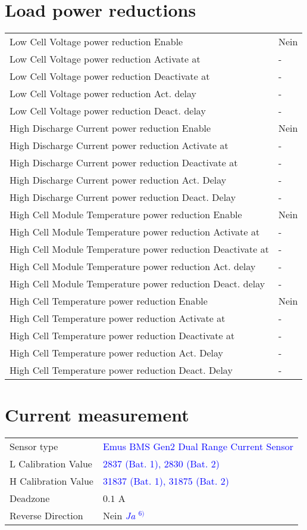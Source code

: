 \section*{Load power reductions}
\begin{tabular}{p{11cm}p{2cm}}
	Low Cell Voltage power reduction Enable & Nein \\
	Low Cell Voltage power reduction Activate at & - \\
	Low Cell Voltage power reduction Deactivate at & - \\
	Low Cell Voltage power reduction Act. delay & - \\
	Low Cell Voltage power reduction Deact. delay & - \\
	High Discharge Current power reduction Enable & Nein \\
	High Discharge Current power reduction Activate at & - \\
	High Discharge Current power reduction Deactivate at & - \\
	High Discharge Current power reduction Act. Delay & - \\
	High Discharge Current power reduction Deact. Delay & - \\
	High Cell Module Temperature power reduction Enable & Nein \\
	High Cell Module Temperature power reduction Activate at & - \\
	High Cell Module Temperature power reduction Deactivate at & - \\
	High Cell Module Temperature power reduction Act. delay & - \\
	High Cell Module Temperature power reduction Deact. delay & - \\
	High Cell Temperature power reduction Enable & Nein \\
	High Cell Temperature power reduction Activate at & - \\
	High Cell Temperature power reduction Deactivate at & - \\
	High Cell Temperature power reduction Act. Delay & - \\
	High Cell Temperature power reduction Deact. Delay & - \\
\end{tabular}

\section*{Current measurement}
\begin{tabular}{p{11cm}p{4cm}}
	Sensor type & \textcolor{blue}{Emus BMS Gen2 Dual Range Current Sensor} \\
	L Calibration Value & \textcolor{blue}{2837 (Bat. 1), 2830 (Bat. 2)} \\
	H Calibration Value & \textcolor{blue}{31837 (Bat. 1), 31875 (Bat. 2)} \\
	Deadzone & $0.1$ A \\
	Reverse Direction & Nein \textcolor{blue}{\textit{Ja} $^{6)}$}
\end{tabular}

